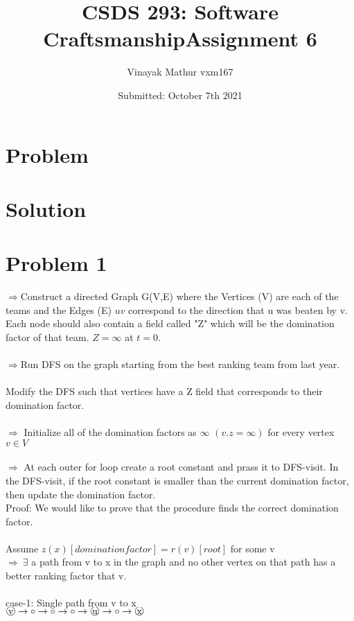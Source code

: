 \documentclass{article}
\title{CSDS 293: Software Craftsmanship\newline Assignment 6}
\author{Vinayak Mathur vxm167}
\date{Submitted: October 7th 2021}
\begin{document}
\maketitle

\section*{Problem}

\section*{Solution}

\section{Problem 1}
$\Rightarrow$Construct a directed Graph G(V,E) where the Vertices (V) are each of the teams and the Edges (E) $uv$ correspond to the direction that u was beaten by v. Each node should also contain a field called "Z" which will be the domination factor of that team. $Z=\infty$ at $t=0$.\\
\\
$\Rightarrow$Run DFS on the graph starting from the best ranking team from last year. \\ \\
Modify the DFS such that vertices have a Z field that corresponds to their domination factor.\\ \\
$\Rightarrow$ Initialize all of the domination factors as $\infty$ $(v.z=\infty)$ for every vertex $v\in V$\\ \\
$\Rightarrow$ At each outer for loop create a root constant and prass it to DFS-visit. In the DFS-visit, if the root constant is smaller than the current domination factor, then update the domination factor.\\
Proof: We would like to prove that the procedure finds the correct domination factor.\\ \\
Assume $z(x)[domination factor]=r(v)[root]$ for some v\\
$\Rightarrow\ \exists$ a path from v to x in the graph and no other vertex on that path has a better ranking factor that v. \\ \\
case-1: Single path from v to x \\
$\raisebox{.5pt}{\textcircled{\raisebox{-.9pt} {v}}}\rightarrow \circ \rightarrow \circ \rightarrow \circ \rightarrow \raisebox{.5pt}{\textcircled{\raisebox{-.9pt} {u}}} \rightarrow \circ \rightarrow \raisebox{.5pt}{\textcircled{\raisebox{-.9pt} {x}}}$\\
\end{document}
